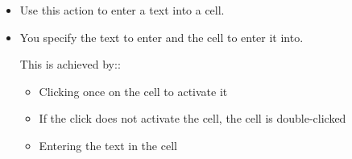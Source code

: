 \begin{itemize}
\item Use this action to enter a text into a cell.
\item You specify the text to enter and the cell to enter it into. 

This is achieved by::
\begin{itemize}
\item Clicking once on the cell to activate it
\item If the click does not activate the cell, the cell is double-clicked
\item Entering the text in the cell
\end{itemize}
\end{itemize}

